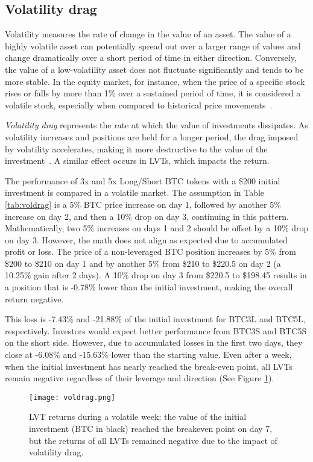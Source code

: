 \subsection{Volatility drag}\label{appx:voldrag}
Volatility measures the rate of change in the value of an asset. The value of a highly volatile asset can potentially spread out over a larger range of values and change dramatically over a short period of time in either direction. Conversely, the value of a low-volatility asset does not fluctuate significantly and tends to be more stable. In the equity market, for instance, when the price of a specific stock rises or falls by more than 1\% over a sustained period of time, it is considered a volatile stock, especially when compared to historical price movements~\cite{Investo_Volatility}.

\textsl{Volatility drag} represents the rate at which the value of investments dissipates. As volatility increases and positions are held for a longer period, the drag imposed by volatility accelerates, making it more destructive to the  value of the investment~\cite{tsalikis2019can, SeekingAlpha_Volatility}. A similar effect occurs in LVTs, which impacts the return.


\begin{example}
	The performance of 3x and 5x Long/Short BTC tokens with a \$200 initial investment is compared in a volatile market. The assumption in Table \ref{tab:voldrag} is a 5\% BTC price increase on day 1, followed by another 5\% increase on day 2, and then a 10\% drop on day 3, continuing in this pattern. Mathematically, two 5\% increases on days 1 and 2 should be offset by a 10\% drop on day 3. However, the math does not align as expected due to accumulated profit or loss. The price of a non-leveraged BTC position increases by 5\% from \$200 to \$210 on day 1 and by another 5\% from \$210 to \$220.5 on day 2 (a 10.25\% gain after 2 days). A 10\% drop on day 3 from \$220.5 to \$198.45 results in a position that is -0.78\% lower than the initial investment, making the overall return negative. 
	
	This loss is -7.43\% and -21.88\% of the initial investment for BTC3L and BTC5L, respectively. Investors would expect better performance from BTC3S and BTC5S on the short side. However, due to accumulated losses in the first two days, they close at -6.08\% and -15.63\% lower than the starting value. Even after a week, when the initial investment has nearly reached the break-even point, all LVTs remain negative regardless of their leverage and direction (See Figure \ref{fig:voldrag}).
	
	\begin{figure}[t]
		\centering
		\texttt{[image: voldrag.png]}
		\caption{LVT returns during a volatile week: the value of the initial investment (BTC in black) reached the breakeven point on day 7, but the returns of all LVTs remained negative due to the impact of volatility drag.}
		\label{fig:voldrag}
	\end{figure}
\end{example}

